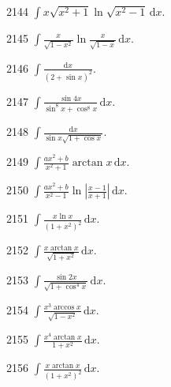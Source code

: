 \begin{prob}[S]{2144}
$\int x\sqrt{x^2 + 1} \ln\sqrt{x^2 - 1} \,\mathrm{d}x$.
\end{prob}

\begin{prob}[S]{2145}
$\int \frac{x}{\sqrt{1 - x^2}} \ln \frac{x}{\sqrt{1 - x}} \,\mathrm{d}x$.
\end{prob}

\begin{prob}[S]{2146}
$\int \frac{\mathrm{d}x}{(2 + \sin x)^2}$.
\end{prob}

\begin{prob}[S]{2147}
$\int \frac{\sin 4x}{\sin^8 x + \cos^8 x} \,\mathrm{d}x$.
\end{prob}

\begin{prob}[S]{2148}
$\int \frac{\mathrm{d}x}{\sin x \sqrt{1 + \cos x}}$.
\end{prob}

\begin{prob}[S]{2149}
$\int \frac{ax^2 + b}{x^2 + 1} \arctan x \,\mathrm{d}x$.
\end{prob}

\begin{prob}[S]{2150}
$\int \frac{ax^2 + b}{x^2 - 1} \ln \left|\frac{x - 1}{x + 1}\right| \,\mathrm{d}x$.
\end{prob}

\begin{prob}[S]{2151}
$\int \frac{x \ln x}{(1 + x^2)^2} \,\mathrm{d}x$.
\end{prob}

\begin{prob}[S]{2152}
$\int \frac{x \arctan x}{\sqrt{1 + x^2}} \,\mathrm{d}x$.
\end{prob}

\begin{prob}[S]{2153}
$\int \frac{\sin 2x}{\sqrt{1 + \cos^4 x}} \,\mathrm{d}x$.
\end{prob}

\begin{prob}[S]{2154}
$\int \frac{x^3 \arccos x}{\sqrt{1 - x^2}} \,\mathrm{d}x$.
\end{prob}

\begin{prob}[S]{2155}
$\int \frac{x^4 \arctan x}{1 + x^2} \,\mathrm{d}x$.
\end{prob}

\begin{prob}[S]{2156}
$\int \frac{x \arctan x}{(1 + x^2)^2} \,\mathrm{d}x$.
\end{prob}

